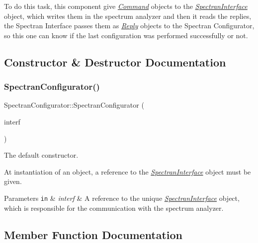 To do this task, this component give {\itshape \hyperlink{classCommand}{Command}} objects to the {\itshape \hyperlink{classSpectranInterface}{Spectran\+Interface}} object, which writes them in the spectrum analyzer and then it reads the replies, the Spectran Interface passes them as {\itshape \hyperlink{classReply}{Reply}} objects to the Spectran Configurator, so this one can know if the last configuration was performed successfully or not. 

\subsection{Constructor \& Destructor Documentation}
\mbox{\label{classSpectranConfigurator_af6a9f524ea5625e6e30be0e843c17c8a}} 
\subsubsection{\texorpdfstring{Spectran\+Configurator()}{SpectranConfigurator()}}
{\footnotesize\ttfamily Spectran\+Configurator\+::\+Spectran\+Configurator (\begin{DoxyParamCaption}\item[{\hyperlink{classSpectranInterface}{Spectran\+Interface} \&}]{interf }\end{DoxyParamCaption})}



The default constructor. 

At instantiation of an object, a reference to the {\itshape \hyperlink{classSpectranInterface}{Spectran\+Interface}} object must be given. 
\begin{DoxyParams}[1]{Parameters}
\mbox{\tt in}  & {\em interf} & A reference to the unique {\itshape \hyperlink{classSpectranInterface}{Spectran\+Interface}} object, which is responsible for the communication with the spectrum analyzer. \\
\hline
\end{DoxyParams}


\subsection{Member Function Documentation}
\mbox{\label{classSpectranConfigurator_a4bea5937bcf7c904c3eb435a2d25e3fb}} 
